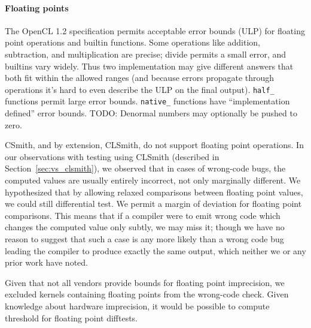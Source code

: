 \paragraph{Floating points} The OpenCL 1.2 specification permits acceptable error bounds (ULP) for floating point operations and builtin functions. Some operations like addition, subtraction, and multiplication are precise; divide permits a small error, and builtins vary widely. Thus two implementation may give different answers that both fit within the allowed ranges (and because errors propagate through operations it's hard to even describe the ULP on the final output). \texttt{half\_} functions permit large error bounds. \texttt{native\_} functions have ``implementation defined'' error bounds. TODO: Denormal numbers may optionally be pushed to zero.

CSmith, and by extension, CLSmith, do not support floating point operations. In our observations with testing using CLSmith (described in Section~\ref{sec:vs_clsmith}), we observed that in cases of wrong-code bugs, the computed values are usually entirely incorrect, not only marginally different. We hypothesized that by allowing relaxed comparisons between floating point values, we could still differential test. We permit a margin of deviation for floating point comparisons. This means that if a compiler were to emit wrong code which changes the computed value only subtly, we may miss it; though we have no reason to suggest that such a case is any more likely than a wrong code bug leading the compiler to produce exactly the same output, which neither we or any prior work have noted.

Given that not all vendors provide bounds for floating point imprecision, we excluded kernels containing floating points from the wrong-code check. Given knowledge about hardware imprecision, it would be possible to compute threshold for floating point difftests.
